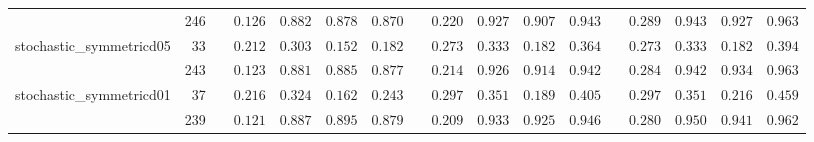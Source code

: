 \begin{longtable}{lr>{\raggedleft\arraybackslash}p{20px}rrrr>{\raggedleft\arraybackslash}p{20px}rrrr>{\raggedleft\arraybackslash}p{20px}rrrr}
 & 246 &  & $0.126$ & $0.882$ & $0.878$ & $0.870$ &  & $0.220$ & $0.927$ & $0.907$ & $0.943$ &  & $0.289$ & $0.943$ & $0.927$ & $0.963$ \\ 
stochastic\_symmetricd05 & 33 &  & $0.212$ & \textbf{$0.303$} & $0.152$ & $0.182$ &  & $0.273$ & \textbf{$0.333$} & $0.182$ & $0.364$ &  & $0.273$ & \textbf{$0.333$} & $0.182$ & $0.394$ \\ 
 & 243 &  & $0.123$ & $0.881$ & $0.885$ & $0.877$ &  & $0.214$ & $0.926$ & $0.914$ & $0.942$ &  & $0.284$ & $0.942$ & $0.934$ & $0.963$ \\ 
stochastic\_symmetricd01 & 37 &  & $0.216$ & \textbf{$0.324$} & $0.162$ & $0.243$ &  & $0.297$ & \textbf{$0.351$} & $0.189$ & $0.405$ &  & $0.297$ & \textbf{$0.351$} & $0.216$ & $0.459$ \\ 
 & 239 &  & $0.121$ & $0.887$ & $0.895$ & $0.879$ &  & $0.209$ & $0.933$ & $0.925$ & $0.946$ &  & $0.280$ & $0.950$ & $0.941$ & $0.962$ \\ 
\bottomrule
\end{longtable}

